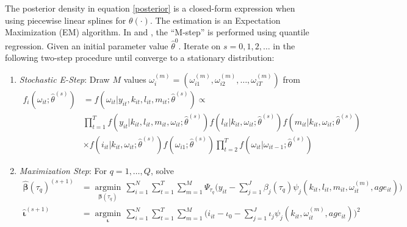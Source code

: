 \documentclass{article}
\begin{document}
The posterior density in equation \eqref{posterior} is a closed-form expression when using piecewise linear splines for $\theta(\cdot)$. The estimation is an Expectation Maximization (EM) algorithm. In \cite{Arellano2016} and \cite{Arellano2017}, the ``M-step'' is performed using quantile regression. Given an initial parameter value $\hat{\theta}^{0}$. Iterate on $s=0,1,2,\dots$ in the following two-step procedure until converge to a stationary distribution:

\begin{enumerate}
    \item \textit{Stochastic E-Step}: Draw $M$ values $\omega_{i}^{(m)}=(\omega_{i1}^{(m)}, \omega_{i2}^{(m)},\dots, \omega_{iT}^{(m)})$ from
        \begin{equation*}
        \begin{split}
            f_{i}(\omega_{it};\hat{\theta}^{(s)})&=f(\omega_{it}|y_{it}, k_{it}, l_{it}, m_{it}; \hat{\theta}^{(s)}) \propto\\
            &\prod_{t=1}^{T}f(y_{it}|k_{it}, l_{it}, m_{it}, \omega_{it};\hat{\theta}^{(s)})f(l_{it}|k_{it}, \omega_{it};\hat{\theta}^{(s)})f(m_{it}|k_{it}, \omega_{it};\hat{\theta}^{(s)}) \\
            &\times f(i_{it}|k_{it}, \omega_{it};\hat{\theta}^{(s)})f(\omega_{i1};\hat{\theta}^{(s)})\prod_{t=2}^{T}f(\omega_{it}|\omega_{it-1};\hat{\theta}^{(s)})
            \end{split}
        \end{equation*}
    \item \textit{Maximization Step}: For $q=1,\dots, Q$, solve
    \begin{equation*}
    \begin{split}
    \hat{\boldsymbol\beta}(\tau_{q})^{(s+1)}&=\underset{\boldsymbol\beta(\tau_{q})}{\operatorname{argmin}}\,\sum_{i=1}^{N}\sum_{t=1}^{T}\sum_{m=1}^{M}\Psi_{\tau_{q}}\bigg(y_{it}-\sum_{j=1}^{J}\beta_{j}(\tau_{q})\psi_{j}(k_{it}, l_{it}, m_{it}, \omega_{it}^{(m)}, age_{it})\bigg)\\
    \hat{\boldsymbol\iota}^{(s+1)}&=\underset{\boldsymbol\iota}{\operatorname{argmin}}\,\sum_{i=1}^{N}\sum_{t=1}^{T}\sum_{m=1}^{M}\bigg(i_{it}-\iota_{0}-\sum_{j=1}^{J}\iota_{j}\psi_{j}(k_{it}, \omega_{it}^{(m)}, age_{it})\bigg)^{2}\\
    \end{split}
    \end{equation*}
    

\end{enumerate}
\end{document}
